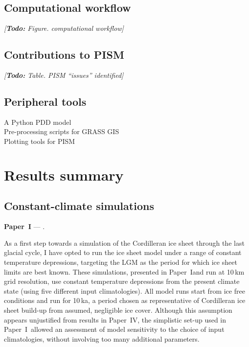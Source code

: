 \documentclass{article}
\newcommand{\todo}[1]{\emph{[\textbf{Todo:} #1]}}
\newcommand{\CCLI}[0]{Paper~I}      %
\newcommand{\CCYC}[0]{Paper~IV}     %
\begin{document}
\subsection{Computational workflow}
\todo{Figure. computational workflow}

\subsection{Contributions to PISM}
\todo{Table. PISM ``issues'' identified}

\subsection{Peripheral tools}
A Python PDD model\\
Pre-processing scripts for GRASS GIS\\
Plotting tools for PISM\\

\section{Results summary}

\subsection{Constant-climate simulations}

\noindent\textbf{\CCLI} --- .
\bigskip

As a first step towards a simulation of the Cordilleran ice sheet through the
last glacial cycle, I have opted to run the ice sheet model under a range of
constant temperature depressions, targeting the LGM as the period for which ice
sheet limits are best known. These simulations, presented in \CCLI and run at
10\,km grid resolution, use constant temperature depressions from the present
climate state (using five different input climatologies). All model runs start
from ice free conditions and run for 10\,ka, a period chosen as representative
of Cordilleran ice sheet build-up from assumed, negligible ice cover. Although
this assumption appears unjustified from results in \CCYC, the simplistic
set-up used in \CCLI\ allowed an assessment of model sensitivity to the choice
of input climatologies, without involving too many additional parameters.
\end{document}
